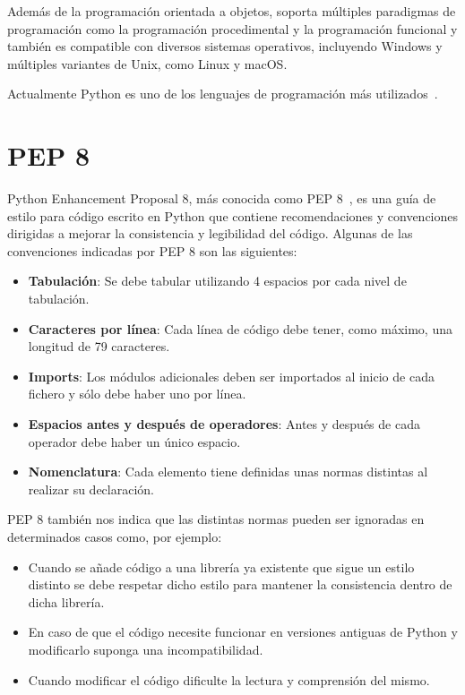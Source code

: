 \documentclass[a4paper, 12pt]{book}
\begin{document}
Además de la programación orientada a objetos, soporta múltiples paradigmas de programación como la programación procedimental y la programación funcional y también es compatible con diversos sistemas operativos, incluyendo Windows y múltiples variantes de Unix, como Linux y macOS.

Actualmente Python es uno de los lenguajes de programación más utilizados~\cite{stackoverflowsurvey}.

\section{PEP 8} 
\label{sec:pep8}
Python Enhancement Proposal 8, más conocida como PEP 8~\cite{pep8}, es una guía de estilo para código escrito en Python que contiene recomendaciones y convenciones dirigidas a mejorar la consistencia y legibilidad del código.
Algunas de las convenciones indicadas por PEP 8 son las siguientes:
\begin{itemize}
	\item \textbf{Tabulación}: Se debe tabular utilizando 4 espacios por cada nivel de tabulación.
	\item \textbf{Caracteres por línea}: Cada línea de código debe tener, como máximo, una longitud de 79 caracteres.
	\item \textbf{Imports}: Los módulos adicionales deben ser importados al inicio de cada fichero y sólo debe haber uno por línea.
	\item \textbf{Espacios antes y después de operadores}: Antes y después de cada operador debe haber un único espacio.
	\item \textbf{Nomenclatura}: Cada elemento tiene definidas unas normas distintas al realizar su declaración.
\end{itemize}

PEP 8 también nos indica que las distintas normas pueden ser ignoradas en determinados casos como, por ejemplo:
\begin{itemize}
	\item Cuando se añade código a una librería ya existente que sigue un estilo distinto se debe respetar dicho estilo para mantener la consistencia dentro de dicha librería.
	\item En caso de que el código necesite funcionar en versiones antiguas de Python y modificarlo suponga una incompatibilidad.
	\item Cuando modificar el código dificulte la lectura y comprensión del mismo. 
\end{itemize}
\end{document}
